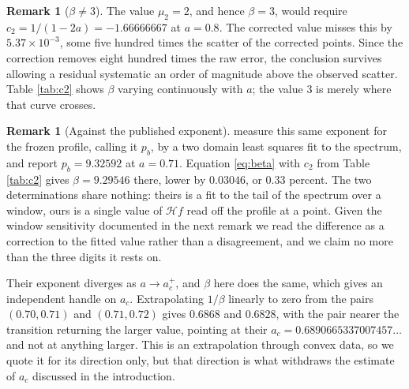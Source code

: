 \documentclass[11pt]{article}
\theoremstyle{definition}
\newtheorem{remark}[proposition]{Remark}
\newcommand{\Hil}{\mathcal{H}}
\begin{document}
\begin{remark}[$\beta \ne 3$]
The value $\mu_2 = 2$, and hence $\beta=3$, would require
$c_2 = 1/(1-2a) = -1.66666667$ at $a=0.8$. The corrected value misses this by
$5.37\times10^{-3}$, some five hundred times the scatter of the corrected
points. Since the correction removes eight hundred times the raw error, the
conclusion survives allowing a residual systematic an order of magnitude above
the observed scatter. Table \ref{tab:c2} shows $\beta$ varying continuously
with $a$; the value $3$ is merely where that curve crosses.
\end{remark}

\begin{remark}[Against the published exponent]
\label{rem:pb}
\cite{lss2020} measure this same exponent for the frozen profile, calling it
$p_b$, by a two domain least squares fit to the spectrum, and report
$p_b = 9.32592$ at $a=0.71$. Equation \eqref{eq:beta} with $c_2$ from Table
\ref{tab:c2} gives $\beta = 9.29546$ there, lower by $0.03046$, or $0.33$
percent. The two determinations share nothing: theirs is a fit to the tail of
the spectrum over a window, ours is a single value of $\Hil f$ read off the
profile at a point. Given the window sensitivity documented in the next remark
we read the difference as a correction to the fitted value rather than a
disagreement, and we claim no more than the three digits it rests on.

Their exponent diverges as $a\to a_c^+$, and $\beta$ here does the same, which
gives an independent handle on $a_c$. Extrapolating $1/\beta$ linearly to zero
from the pairs $(0.70,0.71)$ and $(0.71,0.72)$ gives $0.6868$ and $0.6828$,
with the pair nearer the transition returning the larger value, pointing at
their $a_c = 0.6890665337007457\ldots$ and not at anything larger. This is an
extrapolation through convex data, so we quote it for its direction only, but
that direction is what withdraws the estimate of $a_c$ discussed in the
introduction.
\end{remark}
\end{document}
